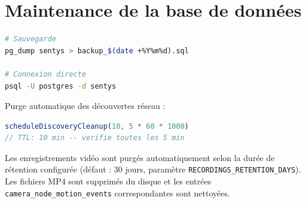 \documentclass[12pt,a4paper]{article}
\begin{document}
\section{Maintenance de la base de données}

\begin{lstlisting}[language=bash]
# Sauvegarde
pg_dump sentys > backup_$(date +%Y%m%d).sql

# Connexion directe
psql -U postgres -d sentys
\end{lstlisting}

Purge automatique des découvertes réseau :
\begin{lstlisting}[language=javascript]
scheduleDiscoveryCleanup(10, 5 * 60 * 1000)
// TTL: 10 min -- verifie toutes les 5 min
\end{lstlisting}

Les enregistrements vidéo sont purgés automatiquement selon la durée de rétention configurée
(défaut : 30 jours, paramètre \texttt{RECORDINGS\_RETENTION\_DAYS}). Les fichiers MP4 sont
supprimés du disque et les entrées \texttt{camera\_node\_motion\_events} correspondantes
sont nettoyées.
\end{document}
